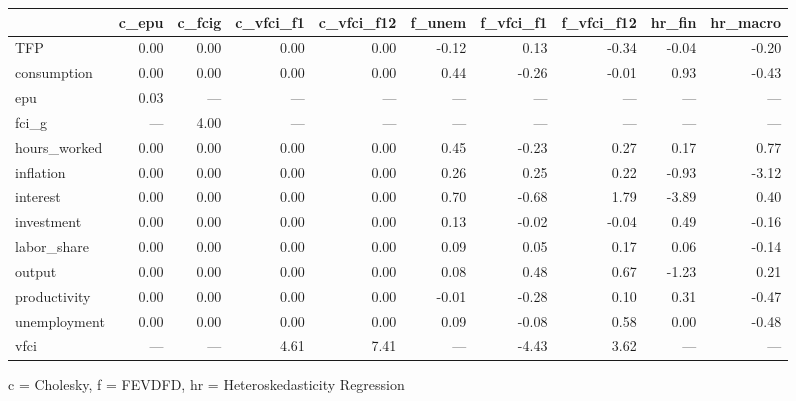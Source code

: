 
\fontsize{12.0pt}{14.4pt}\selectfont
\begin{tabular*}{\linewidth}{@{\extracolsep{\fill}}l|rrrrrrrrr}
\toprule
 & c\_epu & c\_fcig & c\_vfci\_f1 & c\_vfci\_f12 & f\_unem & f\_vfci\_f1 & f\_vfci\_f12 & hr\_fin & hr\_macro \\ 
\midrule\addlinespace[2.5pt]
TFP & 0.00 & 0.00 & 0.00 & 0.00 & -0.12 & 0.13 & -0.34 & -0.04 & -0.20 \\ 
consumption & 0.00 & 0.00 & 0.00 & 0.00 & 0.44 & -0.26 & -0.01 & 0.93 & -0.43 \\ 
epu & 0.03 & — & — & — & — & — & — & — & — \\ 
fci\_g & — & 4.00 & — & — & — & — & — & — & — \\ 
hours\_worked & 0.00 & 0.00 & 0.00 & 0.00 & 0.45 & -0.23 & 0.27 & 0.17 & 0.77 \\ 
inflation & 0.00 & 0.00 & 0.00 & 0.00 & 0.26 & 0.25 & 0.22 & -0.93 & -3.12 \\ 
interest & 0.00 & 0.00 & 0.00 & 0.00 & 0.70 & -0.68 & 1.79 & -3.89 & 0.40 \\ 
investment & 0.00 & 0.00 & 0.00 & 0.00 & 0.13 & -0.02 & -0.04 & 0.49 & -0.16 \\ 
labor\_share & 0.00 & 0.00 & 0.00 & 0.00 & 0.09 & 0.05 & 0.17 & 0.06 & -0.14 \\ 
output & 0.00 & 0.00 & 0.00 & 0.00 & 0.08 & 0.48 & 0.67 & -1.23 & 0.21 \\ 
productivity & 0.00 & 0.00 & 0.00 & 0.00 & -0.01 & -0.28 & 0.10 & 0.31 & -0.47 \\ 
unemployment & 0.00 & 0.00 & 0.00 & 0.00 & 0.09 & -0.08 & 0.58 & 0.00 & -0.48 \\ 
vfci & — & — & 4.61 & 7.41 & — & -4.43 & 3.62 & — & — \\ 
\bottomrule
\end{tabular*}
\begin{minipage}{\linewidth}
c = Cholesky, f = FEVDFD, hr = Heteroskedasticity Regression\\
\end{minipage}


